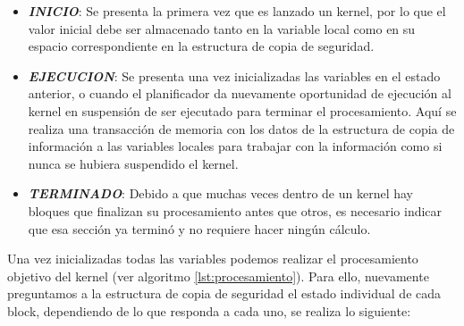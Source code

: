 \begin{itemize}
\item \textit{\textbf{INICIO}}: Se presenta la primera vez que es lanzado un kernel, por lo que el valor inicial debe ser almacenado tanto en la variable local como en su espacio correspondiente en la estructura de copia de seguridad.

\item \textit{\textbf{EJECUCION}}: Se presenta una vez inicializadas las variables en el estado anterior, o cuando el planificador da nuevamente oportunidad de ejecución al kernel en suspensión de ser ejecutado para terminar el procesamiento. Aquí se realiza una transacción de memoria con los datos de la estructura de copia de información a las variables locales para trabajar con la información como si nunca se hubiera suspendido el kernel.

\item \textit{\textbf{TERMINADO}}: Debido a que muchas veces dentro de un kernel hay bloques que finalizan su procesamiento antes que otros, es necesario indicar que esa sección ya terminó y no requiere hacer ningún cálculo.
\end{itemize}



Una vez inicializadas todas las variables podemos realizar el procesamiento objetivo del kernel (ver algoritmo \ref{lst:procesamiento}). Para ello, nuevamente preguntamos a la estructura de copia de seguridad el estado individual de cada block, dependiendo de lo que responda a cada uno, se realiza lo siguiente:



